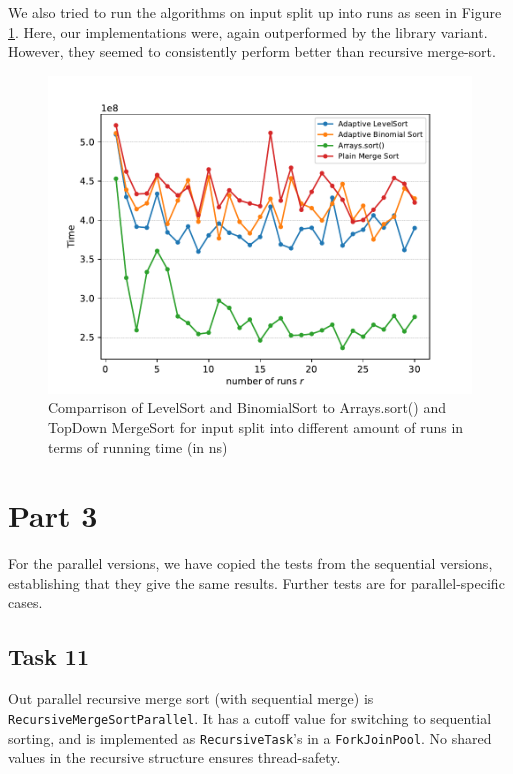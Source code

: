 \documentclass[11pt, a4paper]{article}
\begin{document}
We also tried to run the algorithms on input split up into runs as seen in Figure \ref{fig:adaptComp}. Here, our implementations were, again outperformed by the library variant. However, they seemed to consistently perform better than recursive merge-sort. 

\begin{figure}[h]
  \begin{center}
    \includegraphics[width=\textwidth]{plot/t10runs_time_plot.pdf}
    \caption{Comparrison of LevelSort and BinomialSort to Arrays.sort() and TopDown MergeSort for input split into different amount of runs in terms of running time (in ns)}
    \label{fig:adaptComp}
  \end{center}
\end{figure}




\section{Part 3}

For the parallel versions, we have copied the tests from the sequential versions, establishing that they give the same results. 
Further tests are for parallel-specific cases.

\subsection{Task 11}

Out parallel recursive merge sort (with sequential merge) is \texttt{Recursive\-MergeSort\-Parallel}. It has a cutoff value for switching to sequential sorting, and is implemented as \texttt{Recursive\-Task}'s in a \texttt{Fork\-Join\-Pool}. No shared values in the recursive structure ensures thread-safety.
\end{document}
